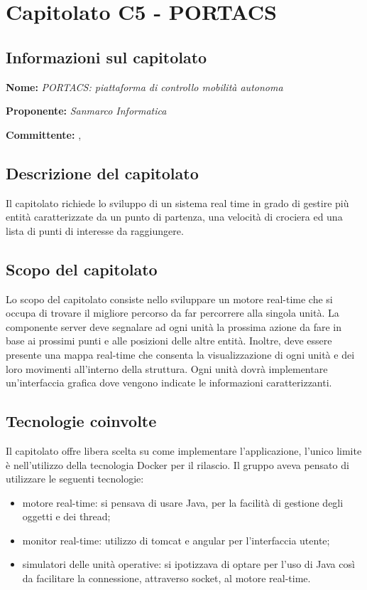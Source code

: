 \section{Capitolato C5 - PORTACS}
\subsection{Informazioni sul capitolato}
\begin{description}
	\item \textbf{Nome:} \textit{PORTACS: piattaforma di controllo mobilità autonoma}
	\item \textbf{Proponente:} \textit{Sanmarco Informatica}
	\item \textbf{Committente:} \VT{}, \CR{}
\end{description}

\subsection{Descrizione del capitolato}
Il capitolato richiede lo sviluppo di un sistema real time in grado di gestire più entità caratterizzate da un punto di partenza, una velocità di crociera ed una lista di punti di interesse da raggiungere.

 \subsection{Scopo del capitolato}
Lo scopo del capitolato consiste nello sviluppare un motore real-time che si occupa di trovare il migliore percorso da far percorrere alla singola unità.
La componente server deve segnalare ad ogni unità la prossima azione da fare in base ai prossimi punti e alle posizioni delle altre entità. Inoltre, deve essere presente una mappa real-time che consenta la visualizzazione di ogni unità e dei loro movimenti all'interno della struttura.
Ogni unità dovrà implementare un'interfaccia grafica dove vengono indicate le informazioni caratterizzanti.

\subsection{Tecnologie coinvolte}
Il capitolato offre libera scelta su come implementare l'applicazione, l'unico limite è nell'utilizzo della tecnologia Docker per il rilascio. Il gruppo aveva pensato di utilizzare le seguenti tecnologie:
\begin{itemize}
	\item motore real-time: si pensava di usare Java, per la facilità di gestione degli oggetti e dei thread;
	\item monitor real-time: utilizzo di tomcat e angular per l'interfaccia utente;
	\item simulatori delle unità operative: si ipotizzava di optare per l'uso di Java così da facilitare la connessione, attraverso socket, al motore real-time.
\end{itemize}


